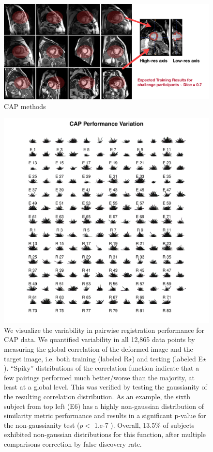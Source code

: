 \documentclass{llncs}
\begin{document}
\begin{figure}[t]
 \centering 
  \includegraphics[width=5in]{../figs/CAP_methods.pdf}
 \caption{CAP methods}
 \label{fig:CAPmethods}
\end{figure}

\begin{figure}[t]
 \centering 
  \includegraphics[width=5in]{../figs/spider_CAP.pdf}
 \caption{We visualize the variability in pairwise registration
   performance for CAP data.  We quantified variability in
   all 12,865 data points by measuring
   the global correlation of the deformed image and the target image,
   i.e. both training (labeled R$\star$) and testing (labeled E$\star$). ``Spiky''
   distributions of the correlation function indicate that
 a few pairings performed much better/worse than the majority, at
 least at a global level.  This
 was verified by testing the gaussianity of the resulting correlation
 distribution.  As an example, the sixth subject from top left (E6) has a
 highly non-gaussian distribution of similarity metric performance and
results in a significant p-value for the non-gaussianity test ($p <$
1.e-7 ).  Overall, 13.5\% of subjects exhibited non-gaussian
distributions for this function, after multiple comparisons correction by false discovery rate.}
 \label{fig:CAPvar}
\end{figure}
\end{document}
